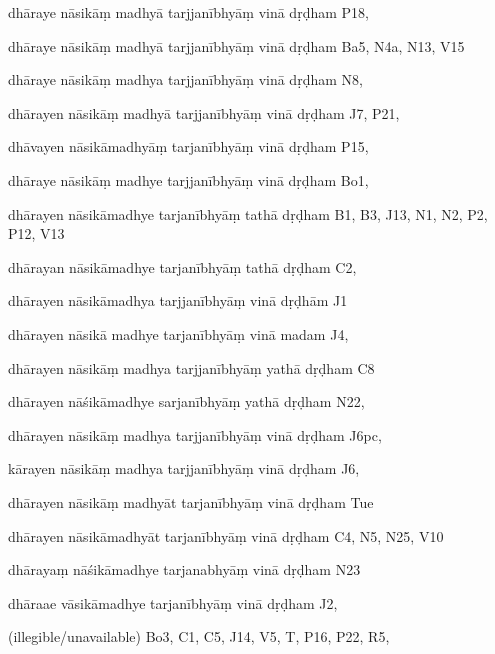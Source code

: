 \begin{ekdosis}
\begin{marma}[hp01_055]
\begin{marma}[hp02_009]
\begin{marma}[hp02_011]
\begin{marma}[hp02_65cd]
\item[dhāraye nāsikāṃ madhyā tarjjanībhyāṃ vinā dṛḍham] P18,
\item[dhāraye nāsikāṃ madhyā tarjjanībhyāṃ vinā dṛḍham] Ba5, N4a, N13, V15
\item[dhāraye nāsikāṃ madhya tarjjanībhyāṃ vinā dṛḍham] N8, 
\item[dhārayen nāsikāṃ madhyā tarjjanībhyāṃ vinā dṛḍham] J7, P21, 
\item[dhāvayen nāsikāmadhyāṃ tarjanībhyāṃ vinā dṛḍham] P15,
\item[dhāraye nāsikāṃ madhye tarjjanībhyāṃ vinā dṛḍham] Bo1,
\item[dhārayen nāsikāmadhye tarjanībhyāṃ tathā dṛḍham] B1, B3, J13, N1, N2, P2, P12, V13
\item[dhārayan nāsikāmadhye tarjanībhyāṃ tathā dṛḍham] C2, 
\item[dhārayen nāsikāmadhya tarjjanībhyāṃ vinā dṛḍhām] J1
\item[dhārayen nāsikā madhye tarjanībhyāṃ vinā madam] J4,
\item[dhārayen nāsikāṃ madhya tarjjanībhyāṃ yathā dṛḍham] C8
\item[dhārayen nāśikāmadhye sarjanībhyāṃ yathā dṛḍham] N22,
\item[dhārayen nāsikāṃ madhya tarjjanībhyāṃ vinā dṛḍham] J6pc,
\item[kārayen nāsikāṃ madhya tarjjanībhyāṃ vinā dṛḍham] J6,
\item[dhārayen nāsikāṃ madhyāt tarjanībhyāṃ vinā dṛḍham] Tue
\item[dhārayen nāsikāmadhyāt tarjanībhyāṃ vinā dṛḍham] C4, N5, N25, V10
\item[dhārayaṃ nāśikāmadhye tarjanabhyāṃ vinā dṛḍham] N23
\item[dhāraae vāsikāmadhye tarjanībhyāṃ vinā dṛḍham] J2,
\item[(illegible/unavailable)] Bo3, C1, C5, J14, V5, T, P16, P22, R5,
  \begin{description}

    \end{description}
 \end{marma}


\end{marma}
\end{marma}
\end{marma}
\end{ekdosis}
